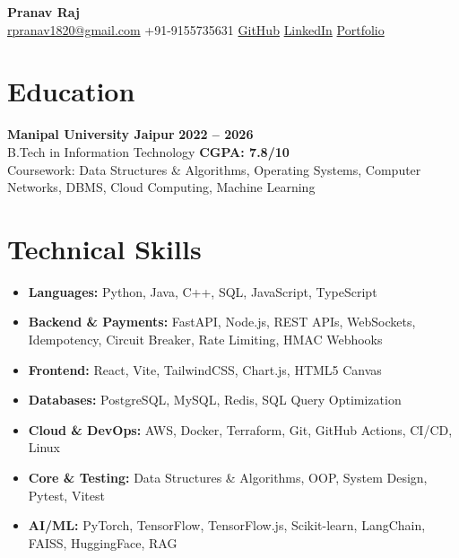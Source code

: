 \documentclass[a4paper,11pt]{article}
\begin{document}
\begin{center}
{\LARGE\bfseries Pranav Raj}\\[5pt]
{\small
\href{mailto:rpranav1820@gmail.com}{rpranav1820@gmail.com}
\hspace{0.5em}\textbullet\hspace{0.5em}
+91-9155735631
\hspace{0.5em}\textbullet\hspace{0.5em}
\href{https://github.com/pranav172}{GitHub}
\hspace{0.5em}\textbullet\hspace{0.5em}
\href{https://www.linkedin.com/in/pranav-raj-163230256/}{LinkedIn}
\hspace{0.5em}\textbullet\hspace{0.5em}
\href{https://pranavraj.xyz}{Portfolio}}
\end{center}

\section*{Education}

\textbf{Manipal University Jaipur} \hfill \textbf{2022 -- 2026}\\
B.Tech in Information Technology \hfill \textbf{CGPA: 7.8/10}\\
{\small Coursework: Data Structures \& Algorithms, Operating Systems, Computer Networks, DBMS, Cloud Computing, Machine Learning}

\section*{Technical Skills}

\begin{itemize}
    \item \textbf{Languages:} Python, Java, C++, SQL, JavaScript, TypeScript
    \item \textbf{Backend \& Payments:} FastAPI, Node.js, REST APIs, WebSockets, Idempotency, Circuit Breaker, Rate Limiting, HMAC Webhooks
    \item \textbf{Frontend:} React, Vite, TailwindCSS, Chart.js, HTML5 Canvas
    \item \textbf{Databases:} PostgreSQL, MySQL, Redis, SQL Query Optimization
    \item \textbf{Cloud \& DevOps:} AWS, Docker, Terraform, Git, GitHub Actions, CI/CD, Linux
    \item \textbf{Core \& Testing:} Data Structures \& Algorithms, OOP, System Design, Pytest, Vitest
    \item \textbf{AI/ML:} PyTorch, TensorFlow, TensorFlow.js, Scikit-learn, LangChain, FAISS, HuggingFace, RAG
\end{itemize}
\end{document}
